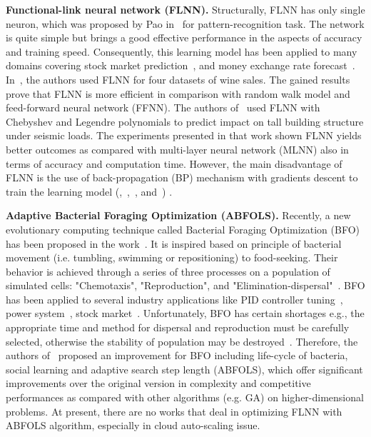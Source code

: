 \documentclass[runningheads]{llncs}
\begin{document}
\textbf{Functional-link neural network (FLNN).} 
Structurally, FLNN has only single neuron, which was proposed by Pao in~\cite{ref_pao} for pattern-recognition task. The network is quite simple but brings a good effective performance in the aspects of accuracy and training speed. Consequently, this learning model has been applied to many domains covering stock market prediction~\cite{ref_majhi}, and money exchange rate forecast~\cite{ref_rout}. In~\cite{ref_khan}, the authors used FLNN for four datasets of wine sales.
The gained results prove that FLNN is more efficient in comparison with random walk model and feed-forward neural network (FFNN). The authors of~\cite{ref_sahoo} used FLNN with Chebyshev and Legendre polynomials to predict impact on tall building structure under seismic loads. The experiments presented in that work shown FLNN yields better outcomes as compared with multi-layer neural network (MLNN) also in terms of accuracy and computation time. However, the main disadvantage of FLNN is the use of back-propagation (BP) mechanism with gradients descent to train the learning model (\cite{ref_majhi},~\cite{ref_rout},~\cite{ref_khan}, and~\cite{ref_sahoo}) . 
 

\textbf{Adaptive Bacterial Foraging Optimization (ABFOLS).}
Recently, a new evolutionary computing technique called Bacterial Foraging Optimization (BFO) has been proposed in the work~\cite{ref_passino}. It is inspired based on principle of bacterial movement (i.e. tumbling, swimming or repositioning) to food-seeking. 
Their behavior is achieved through a series of three processes on a population of simulated cells: "Chemotaxis", "Reproduction", and "Elimination-dispersal"~\cite{ref_passino}. BFO has been applied to several industry applications like PID controller tuning~\cite{ref_kim}, power system~\cite{ref_ali}, stock market~\cite{ref_ritanjali_majhi}. 
Unfortunately, BFO has certain shortages e.g., the appropriate time and method for dispersal and reproduction must be carefully selected, otherwise the stability of population may be destroyed~\cite{ref_yan}. 
Therefore, the authors of~\cite{ref_yan} proposed an improvement for BFO including life-cycle of bacteria, social learning and adaptive search step length (ABFOLS), 
which offer significant improvements over the original version in complexity and competitive performances as compared with other algorithms (e.g. GA) on higher-dimensional problems. 
At present, there are no works that deal in optimizing FLNN with ABFOLS algorithm, especially in cloud auto-scaling issue.
\end{document}
